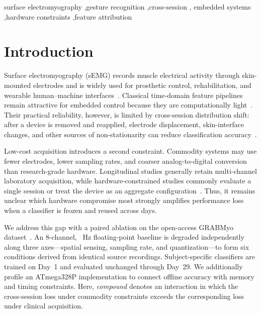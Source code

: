 \documentclass[preprint,12pt]{elsarticle}
\begin{document}
\begin{frontmatter}
\begin{keyword}
surface electromyography \sep gesture recognition \sep cross-session \sep
embedded systems \sep hardware constraints \sep feature attribution
\end{keyword}
\end{frontmatter}

\section{Introduction}
Surface electromyography (sEMG) records muscle electrical activity through skin-mounted electrodes and is widely used for prosthetic control, rehabilitation, and wearable human--machine interfaces~\cite{ASGHARIOSKOEI2007275}. Classical time-domain feature pipelines remain attractive for embedded control because they are computationally light~\cite{204774,1206493}. Their practical reliability, however, is limited by cross-session distribution shift: after a device is removed and reapplied, electrode displacement, skin-interface changes, and other sources of non-stationarity can reduce classification accuracy~\cite{10.3389/fnbot.2018.00058,8009405}.

Low-cost acquisition introduces a second constraint. Commodity systems may use fewer electrodes, lower sampling rates, and coarser analog-to-digital conversion than research-grade hardware. Longitudinal studies generally retain multi-channel laboratory acquisition, while hardware-constrained studies commonly evaluate a single session or treat the device as an aggregate configuration~\cite{Pizzolato2017-zd,7974234}. Thus, it remains unclear which hardware compromise most strongly amplifies performance loss when a classifier is frozen and reused across days.

We address this gap with a paired ablation on the open-access GRABMyo dataset~\cite{pradhan2022grabmyo,PhysioNet-grabmyo-1.1.0}. An 8-channel, \fsClinical{}~Hz floating-point baseline is degraded independently along three axes---spatial sensing, sampling rate, and quantization---to form six conditions derived from identical source recordings. Subject-specific classifiers are trained on Day~1 and evaluated unchanged through Day~29. We additionally profile an ATmega328P implementation to connect offline accuracy with memory and timing constraints. Here, \emph{compound} denotes an interaction in which the cross-session loss under commodity constraints exceeds the corresponding loss under clinical acquisition.
\end{document}
